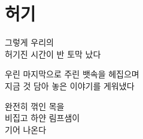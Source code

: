 \hypertarget{uxd5c8uxae30}{%

\section{허기}\label{uxd5c8uxae30}}



그렇게 우리의\\

허기진 시간이 반 토막 났다



우린 마지막으로 주린 뱃속을 헤집으며\\

지금 것 담아 놓은 이야기를 게워냈다



완전히 꺾인 목을\\

비집고 하얀 림프샘이\\

기어 나온다

